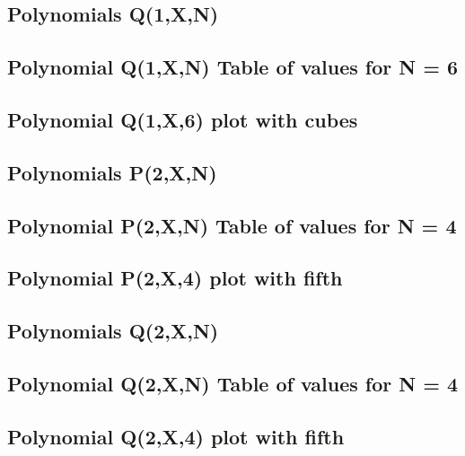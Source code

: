 \documentclass[12pt,letterpaper,oneside,reqno]{amsart}
\begin{document}
    \subsection{Polynomials Q(1,X,N)}
    

    \subsection{Polynomial Q(1,X,N) Table of values for N = 6}
    

    \subsection{Polynomial Q(1,X,6) plot with cubes}
    

    \subsection{Polynomials P(2,X,N)}
    

    \subsection{Polynomial P(2,X,N) Table of values for N = 4}
    

    \subsection{Polynomial P(2,X,4) plot with fifth}
    

    \subsection{Polynomials Q(2,X,N)}
    

    \subsection{Polynomial Q(2,X,N) Table of values for N = 4}
    

    \subsection{Polynomial Q(2,X,4) plot with fifth}
    
\end{document}
